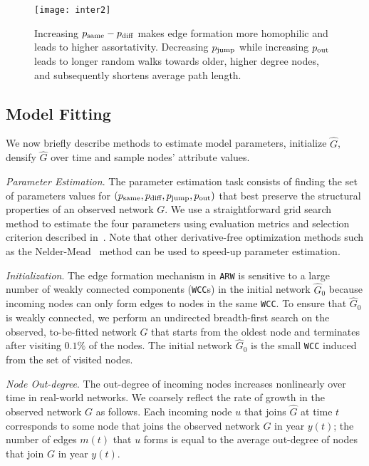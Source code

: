 \begin{figure}[H]
 \centering
 \texttt{[image: inter2]}
 \caption{
 	Increasing $p_{\scriptsize\mbox{same}}-p_{\scriptsize\mbox{diff}}$ makes edge formation more homophilic
	and leads to higher assortativity. Decreasing $p_{\scriptsize\mbox{jump}}$ while increasing
	$p_{\scriptsize\mbox{out}}$ leads to longer random walks towards older, higher degree nodes,
	and subsequently shortens average path length.
 }
 \label{fig:inter2}
\end{figure}



\subsection{Model Fitting}
\label{sub:Model Fitting}

We now briefly describe methods to estimate model parameters,
initialize $\hat{G}$, densify $\hat{G}$ over time and sample nodes' attribute values.

\textit{Parameter Estimation}.
The parameter estimation task consists of finding the set of parameters values
for $(p_{\scriptsize\mbox{same}}, p_{\scriptsize\mbox{diff}}, p_{\scriptsize\mbox{jump}}, p_{\scriptsize\mbox{out}})$ that best preserve the structural properties of an
observed network $G$. We use a straightforward grid search method to estimate
the four parameters using evaluation metrics and selection criterion described in~.
Note that other derivative-free optimization methods such as the Nelder-Mead~\cite{nelder1965simplex} method
can be used to speed-up parameter estimation.

\textit{Initialization}. The edge formation mechanism in \texttt{ARW} is
sensitive to a large number of weakly connected components (\texttt{WCC}s) in the
initial network $\hat{G}_0$ because incoming nodes can only form edges to nodes
in the same \texttt{WCC}. To ensure that $\hat{G}_0$ is weakly
connected, we perform an undirected breadth-first search on the observed,
to-be-fitted network $G$ that starts from the oldest node and terminates after
visiting $0.1\%$ of the nodes. The initial network $\hat{G}_0$ is the small \texttt{WCC}
induced from the set of visited nodes.


\textit{Node Out-degree}.
The out-degree of incoming nodes increases  nonlinearly over time in real-world networks.
We coarsely reflect the rate of growth in the observed network $G$ as follows.
Each incoming node $u$ that joins $\hat{G}$ at time $t$ corresponds to some
node that joins the observed network $G$ in year $y(t)$; the number of edges $m(t)$
that $u$ forms is equal to the average out-degree of nodes that join $G$ in year $y(t)$.

